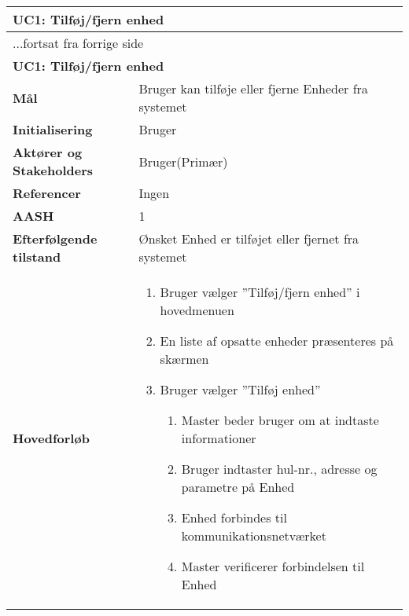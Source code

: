 \begin{center} \centering \label{UC1}
	\begin{longtable}{|p{5cm}|p{9cm}|}  %
	\hline
		\multicolumn{2}{|l|}{\textbf{UC1: Tilføj\slash fjern enhed}} \\\hline %
		\endfirsthead
		
		\multicolumn{2}{l}{...fortsat fra forrige side} \\ \hline %
		\multicolumn{2}{|l|}{\textbf{UC1: Tilføj\slash fjern enhed}} \\\hline %
		\endhead	
		
		\textbf{Mål}								&Bruger kan tilføje eller fjerne Enheder fra systemet			\\\hline
		\textbf{Initialisering}					&Bruger														\\\hline
		\textbf{Aktører og Stakeholders}			&Bruger(Primær)												\\\hline 
		\textbf{Referencer}						&Ingen														\\\hline
		\textbf{AASH}							&1															\\\hline
		\textbf{Efterfølgende tilstand}			&Ønsket Enhed er tilføjet eller fjernet fra systemet		\\\hline
		\textbf{Hovedforløb}					
			&\begin{enumerate}
	
				\item Bruger vælger ''Tilføj/fjern enhed'' i hovedmenuen
				
				\item En liste af opsatte enheder præsenteres på skærmen				
				
				\item \label{uc1valg} Bruger vælger ''Tilføj enhed''
				
				\begin{enumerate}
					\item \label{uc1indtast} Master beder bruger om at indtaste informationer
					
					\item \label{uc1indtast_fejl} Bruger indtaster hul-nr., adresse og parametre på Enhed
										
					\item Enhed forbindes til kommunikationsnetværket
					
					\item \label{uc1verif} Master verificerer forbindelsen til Enhed
						

\end{enumerate}
\end{enumerate}
\end{longtable}
\end{center}
